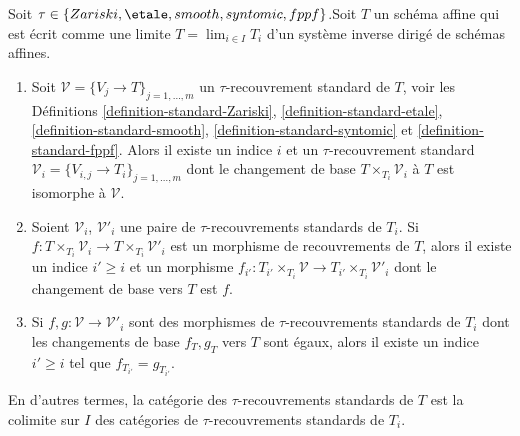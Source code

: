 \begin{lemma}
\label{lemma-limit-fppf-topology}
Soit $\tau \in \{Zariski,\allowbreak \etale,\allowbreak smooth,\allowbreak syntomic,\allowbreak fppf\}$.\newline Soit $T$ un schéma affine qui est écrit comme une limite $T = \lim_{i \in I} T_i$ d'un système inverse dirigé de schémas affines.
\begin{enumerate}
\item Soit $\mathcal{V} = \{V_j \to T\}_{j = 1, \ldots, m}$ un $\tau$-recouvrement standard de $T$, voir les Définitions \ref{definition-standard-Zariski}, \ref{definition-standard-etale}, \ref{definition-standard-smooth}, \ref{definition-standard-syntomic} et \ref{definition-standard-fppf}. Alors il existe un indice $i$ et un $\tau$-recouvrement standard $\mathcal{V}_i = \{V_{i, j} \to T_i\}_{j = 1, \ldots, m}$ dont le changement de base $T \times_{T_i} \mathcal{V}_i$ à $T$ est isomorphe à $\mathcal{V}$.
\item Soient $\mathcal{V}_i$, $\mathcal{V}'_i$ une paire de $\tau$-recouvrements standards de $T_i$. Si $f : T \times_{T_i} \mathcal{V}_i \to T \times_{T_i} \mathcal{V}'_i$ est un morphisme de recouvrements de $T$, alors il existe un indice $i' \geq i$ et un morphisme $f_{i'} : T_{i'} \times_{T_i} \mathcal{V} \to T_{i'} \times_{T_i} \mathcal{V}'_i$ dont le changement de base vers $T$ est $f$.
\item Si $f, g : \mathcal{V} \to \mathcal{V}'_i$ sont des morphismes de $\tau$-recouvrements standards de $T_i$ dont les changements de base $f_T, g_T$ vers $T$ sont égaux, alors il existe un indice $i' \geq i$ tel que $f_{T_{i'}} = g_{T_{i'}}$.
\end{enumerate}
En d'autres termes, la catégorie des $\tau$-recouvrements standards de $T$ est la colimite sur $I$ des catégories de $\tau$-recouvrements standards de $T_i$.
\end{lemma}

